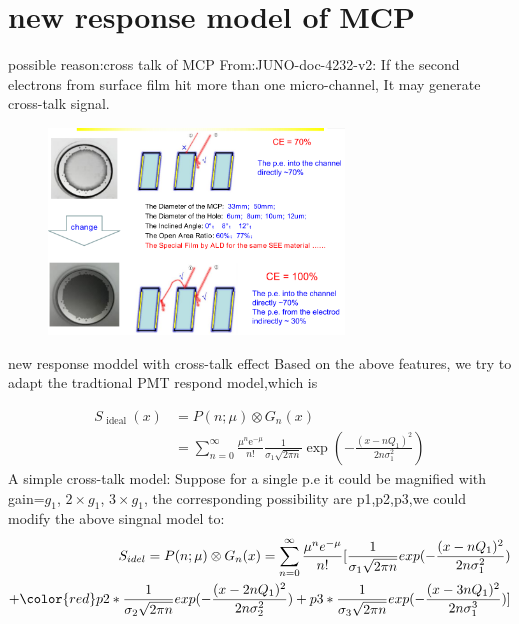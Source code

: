 \documentclass[11pt,compress,xcolor=x11names,UTF8]{beamer}
\begin{document}
\section{new response model of MCP}
\begin{frame}{ possible reason:cross talk of MCP}
	From:JUNO-doc-4232-v2:
	If the second electrons from surface film hit more than one micro-channel, It may generate cross-talk signal. 
\begin{figure}
\centering
	\includegraphics[width=0.7\textwidth]{figure/mcpqs}
\end{figure}
\end{frame}
\begin{frame}{ new response moddel with cross-talk effect}
Based on the above features, we try to adapt the tradtional PMT respond model,which is

\begin{equation}\begin{aligned} S_{\text { ideal }}(x) &=P(n ; \mu) \otimes G_{n}(x) \\ &=\sum_{n=0}^{\infty} \frac{\mu^{n} \mathrm{e}^{-\mu}}{n !} \frac{1}{\sigma_{1} \sqrt{2 \pi n}} \exp \left(-\frac{\left(x-n Q_{1}\right)^{2}}{2 n \sigma_{1}^{2}}\right) \end{aligned}\end{equation}
	A simple cross-talk model: \alert{Suppose for a single p.e it could be magnified with gain={$g_{1}$, $2\times g_{1}$, $3\times g_{1}$}, the corresponding possibility are p1,p2,p3},we could modify the above singnal model to:
	\begin{equation}
		\begin{split}
			S_{idel}=P(n;\mu)\otimes G_{n}(x)=\sum_{n=0}^{\infty}\frac{\mu^{n}e^{-\mu}}{n!}[\frac{1}{\sigma_{1}\sqrt{2\pi n}}exp(-\frac{(x-nQ_{1})^2}{2n\sigma_{1}^{2}})\\+{\color{red}p2*\frac{1}{\sigma_{2}\sqrt{2\pi n}}exp(-\frac{(x-2nQ_{1})^2}{2n\sigma_{2}^{2}})+p3*\frac{1}{\sigma_{3}\sqrt{2\pi n}}exp(-\frac{(x-3nQ_{1})^2}{2n\sigma_{1}^{3}})}]
		\end{split}
	\end{equation}
\end{frame}
\end{document}
